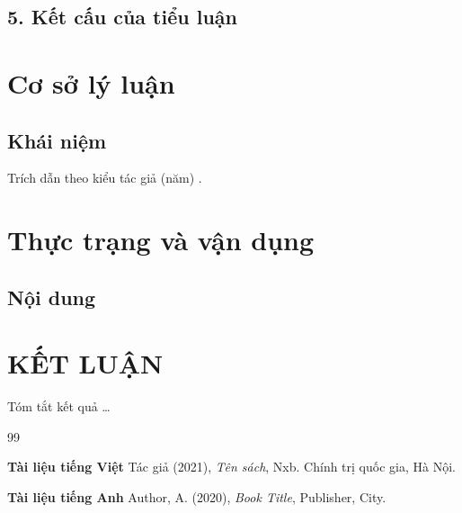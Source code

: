 \documentclass[a4paper,fontsize=13pt,oneside,numbers=noenddot,chapterprefix=true]{scrreprt}
\begin{document}
\section*{5. Kết cấu của tiểu luận}

\chapter{Cơ sở lý luận}
\section{Khái niệm}
Trích dẫn theo kiểu tác giả (năm) \cite[tr.~187]{mac}.

\chapter{Thực trạng và vận dụng}
\section{Nội dung}

\chapter*{KẾT LUẬN}
Tóm tắt kết quả \dots

\begin{thebibliography}{99}
\item[] \textbf{Tài liệu tiếng Việt}
 Tác giả (2021), \emph{Tên sách}, Nxb. Chính trị quốc gia, Hà Nội.
\item[] \textbf{Tài liệu tiếng Anh}
 Author, A. (2020), \emph{Book Title}, Publisher, City.
\end{thebibliography}
\end{document}
